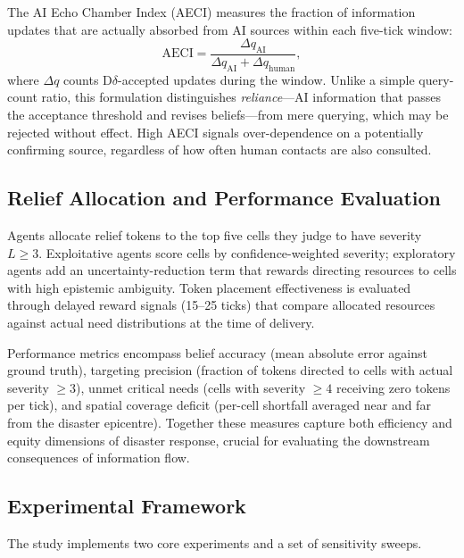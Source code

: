 \documentclass[pdflatex,sn-apa]{sn-jnl}%
\begin{document}
The AI Echo Chamber Index (AECI) measures the fraction of information updates
that are actually absorbed from AI sources within each five-tick window:
%
\begin{equation}
  \mathrm{AECI} = \frac{\Delta q_{\mathrm{AI}}}
                       {\Delta q_{\mathrm{AI}} + \Delta q_{\mathrm{human}}},
  \label{eq:aeci}
\end{equation}
%
where $\Delta q$ counts D$\delta$-accepted updates during the window.
Unlike a simple query-count ratio, this formulation distinguishes
\emph{reliance}---AI information that passes the acceptance threshold and
revises beliefs---from mere querying, which may be rejected without effect.
High AECI signals over-dependence on a potentially confirming source, regardless
of how often human contacts are also consulted.

\subsection{Relief Allocation and Performance Evaluation}

Agents allocate relief tokens to the top five cells they judge to have severity
$L\geq3$.
Exploitative agents score cells by confidence-weighted severity; exploratory agents
add an uncertainty-reduction term that rewards directing resources to cells with
high epistemic ambiguity.
Token placement effectiveness is evaluated through delayed reward signals
(15--25 ticks) that compare allocated resources against actual need distributions
at the time of delivery.

Performance metrics encompass belief accuracy (mean absolute error against ground
truth), targeting precision (fraction of tokens directed to cells with actual
severity $\geq3$), unmet critical needs (cells with severity $\geq4$ receiving zero
tokens per tick), and spatial coverage deficit (per-cell shortfall averaged near
and far from the disaster epicentre).
Together these measures capture both efficiency and equity dimensions of disaster
response, crucial for evaluating the downstream consequences of information flow.

\subsection{Experimental Framework}

The study implements two core experiments and a set of sensitivity sweeps.
\end{document}
